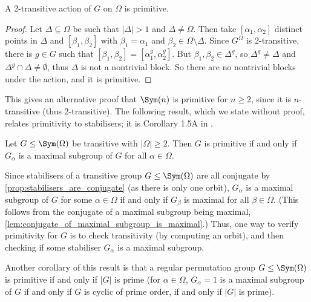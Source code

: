 \begin{proposition}\label{prop:2-transitivity_implies_primitivity}
    A 2-transitive action of $G$ on $\Omega$ is primitive.
\end{proposition}

\begin{proof}
    Let $\Delta \subseteq \Omega$ be such that $|\Delta| > 1$ and $\Delta \neq \Omega$. Then take $[\alpha_1,\alpha_2]$ distinct points in $\Delta$ and $[\beta_1,\beta_2]$ with $\beta_1 = \alpha_1$ and $\beta_2 \in \Omega \setminus \Delta$. Since $G^\Omega$ is 2-transitive, there is $g \in G$ such that $[\beta_1,\beta_2] = [\alpha_1^g,\alpha_2^g]$. But $\beta_1,\beta_2 \in \Delta^g$, so $\Delta^g \neq \Delta$ and $\Delta^g \cap \Delta \neq \emptyset$, thus $\Delta$ is not a nontrivial block. So there are no nontrivial blocks under the action, and it is primitive.
\end{proof}

This gives an alternative proof that $\Sym(n)$ is primitive for $n \geq 2$, since it is $n$-transitive (thus 2-transitive).  The following result, which we state without proof, relates primitivity to stabilisers; it is Corollary 1.5A in \cite{dixon_mortimer_perm_groups1996}.

\begin{proposition}\label{prop:primitive_iff_stabilisers_maximal}
    Let $G \leq \Sym(\Omega)$ be transitive with $|\Omega| \geq 2$. Then $G$ is primitive if and only if $G_\alpha$ is a maximal subgroup of $G$ for all $\alpha \in \Omega$.
\end{proposition}

Since stabilisers of a transitive group $G \leq \Sym(\Omega)$ are all conjugate by \autoref{prop:stabilisers_are_conjugate} (as there is only one orbit), $G_\alpha$ is a maximal subgroup of $G$ for some $\alpha \in \Omega$ if and only if $G_\beta$ is maximal for all $\beta \in \Omega$. (This follows from the conjugate of a maximal subgroup being maximal, \autoref{lem:conjugate_of_maximal_subgroup_is_maximal}.) Thus, one way to verify primitivity for $G$ is to check transitivity (by computing an orbit), and then checking if some stabiliser $G_\alpha$ is a maximal subgroup.

Another corollary of this result is that a regular permutation group $G \leq \Sym(\Omega)$ is primitive if and only if $|G|$ is prime (for $\alpha \in \Omega$, $G_\alpha = 1$ is a maximal subgroup of $G$ if and only if $G$ is cyclic of prime order, if and only if $|G|$ is prime). 

